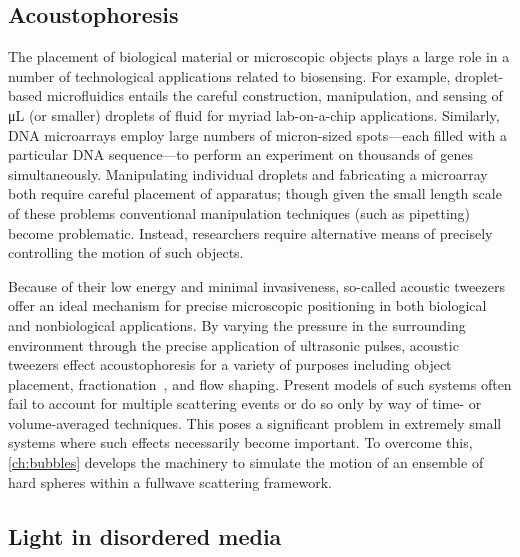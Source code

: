 \subsection{Acoustophoresis}

The placement of biological material or microscopic objects plays a large role in a number of technological applications related to biosensing.
For example, droplet-based microfluidics entails the careful construction, manipulation, and sensing of \si{\micro\liter} (or smaller) droplets of fluid for myriad lab-on-a-chip applications.
Similarly, DNA microarrays employ large numbers of micron-sized spots---each filled with a particular DNA sequence---to perform an experiment on thousands of genes simultaneously.
Manipulating individual droplets and fabricating a microarray both require careful placement of apparatus; though given the small length scale of these problems conventional manipulation techniques (such as pipetting) become problematic.
Instead, researchers require alternative means of precisely controlling the motion of such objects.

Because of their low energy and minimal invasiveness, so-called acoustic tweezers offer an ideal mechanism for precise microscopic positioning in both biological and nonbiological applications.
By varying the pressure in the surrounding environment through the precise application of ultrasonic pulses, acoustic tweezers effect acoustophoresis for a variety of purposes including object placement, fractionation~\cite{Petersson2007}, and flow shaping.
Present models of such systems often fail to account for multiple scattering events or do so only by way of time- or volume-averaged techniques.
This poses a significant problem in extremely small systems where such effects necessarily become important.
To overcome this, \cref{ch:bubbles} develops the machinery to simulate the motion of an ensemble of hard spheres within a fullwave scattering framework.

\subsection{Light in disordered media}

